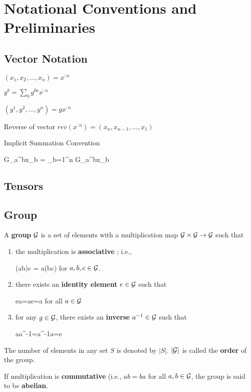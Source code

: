\chapter{Notational Conventions and Preliminaries}
\label{ch-conventions}

\section{Vector Notation}

$(x_1, x_2, \ldots, x_n) = x^{:n}$

$y^b = \sum_b g^{ba}x^{:n}$

$(y^1, y^2, \ldots, y^n)= gx^{:n}$

Reverse of vector $rev(x^{:n})=
(x_n, x_{n-1},
\ldots, x_1)$

Implicit Summation Convention

\beq
G_a^bx_b = \sum_{b=1}^n
G_a^bx_b
\eeq

\section{Tensors}

\section{Group}

A {\bf group}
${\cal G}$
is a set of elements
with a multiplication map ${\cal G}\times {\cal G}
\rightarrow {\cal G}$
such that


\begin{enumerate}
\item 
the multiplication is {\bf associative
}; i.e., 

\beq
(ab)c = a(bc)
\eeq
for $a,b,c\in{\cal G}$.

\item
there exists an {\bf identity element}
$e\in {\cal G}$
such that 

\beq
ea=ae=a
\eeq
for all $a\in {\cal G}$

\item
for any $g\in{\cal G}$,
there exists an {\bf inverse} $a^{-1}\in {\cal G}$ such that

\beq
aa^{-1}=a^{-1}a=e
\eeq
\end{enumerate}

The number of elements in any set $S$ is denoted by $|S|$. 
$|{\cal G}|$
is called the {\bf order}
of the group.

If multiplication is
{\bf commutative}
(i.e., $ab=ba$ for all $a,b\in{\cal G}$,
the group is said to be {\bf abelian}.

